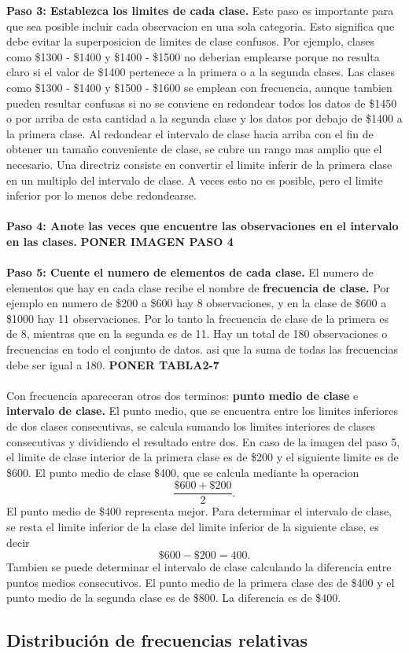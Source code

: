 \documentclass[]{article}
\begin{document}
\textbf{Paso 3: Establezca los limites de cada clase.} Este paso es importante para que sea posible incluir cada observacion en una sola categoria. Esto significa que debe evitar la superposicion de limites de clase confusos. Por ejemplo, clases como \$1300 - \$1400 y \$1400 - \$1500 no deberian emplearse porque no resulta claro si el valor de \$1400 pertenece a la primera o a la segunda clases. Las clases como \$1300 - \$1400 y \$1500 - \$1600 se emplean con frecuencia, aunque tambien pueden resultar confusas si no se conviene en redondear todos los datos de \$1450 o por arriba de esta cantidad a la segunda clase y los datos por debajo de \$1400 a la primera clase. Al redondear el intervalo de clase hacia arriba con el fin de obtener un tamaño conveniente de clase, se cubre un rango mas amplio que el necesario. Una directriz consiste en convertir el limite inferir de la primera clase en un multiplo del intervalo de clase. A veces esto no es posible, pero el limite inferior por lo menos debe redondearse.\\\\
\textbf{Paso 4: Anote las veces que encuentre las observaciones en el intervalo en las clases.}  \textbf{PONER IMAGEN PASO 4}
\\\\\textbf{Paso 5: Cuente el numero de elementos de cada clase.}  El numero de elementos que hay en cada clase recibe el nombre de \textbf{frecuencia de clase.} Por ejemplo en numero de \$200 a \$600 hay 8 observaciones, y en la clase de \$600 a \$1000 hay 11 observaciones. Por lo tanto la frecuencia de clase de la primera es de 8, mientras que en la segunda es de 11. Hay un total de 180 observaciones o frecuencias en todo el conjunto de datos. asi que la suma de todas las frecuencias debe ser igual a 180. \textbf{PONER TABLA2-7}\\\\
Con frecuencia apareceran otros dos terminos: \textbf{punto medio de clase} e \textbf{intervalo de clase.} El punto medio, que se encuentra entre los limites inferiores de dos clases consecutivas, se calcula sumando los limites interiores de clases consecutivas y dividiendo el resultado entre dos. En caso de la imagen del paso 5, el limite de clase interior de la primera clase es de \$200 y el siguiente limite es de \$600. El punto medio de clase \$400, que se calcula mediante la operacion \[ \frac{\$600+\$200}{2} .\] El punto medio de \$400 representa mejor. Para determinar el intervalo de clase, se resta el limite inferior de la clase del limite inferior de la siguiente clase, es decir \[ \$600 -\$200 =400.\]Tambien se puede determinar el intervalo de clase calculando la diferencia entre puntos medios consecutivos. El punto medio de la primera clase des de \$400 y el punto medio de la segunda clase es de \$800. La diferencia es de \$400.
\subsection{Distribución de frecuencias relativas}
\end{document}
